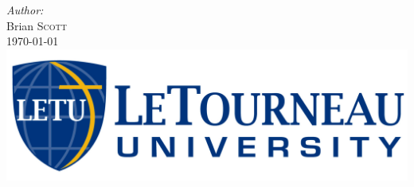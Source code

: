 \begin{titlepage}
\Large \emph{Author:}\\
Brian \textsc{Scott}\\[1cm] %


{\large \datef\today}\\[2cm] %


\includegraphics[scale=0.20]{gfx/logoHoriz.jpg}\\[1cm] %
 

\vfill %
\end{titlepage}